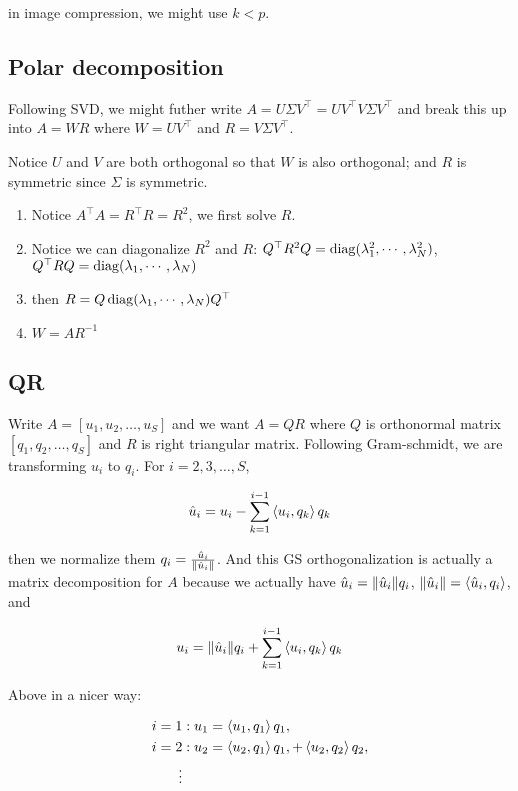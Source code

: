 \documentclass{article}
\begin{document}
\begin{remark}
    in image compression, we might use \(k<p\).
\end{remark}

\subsection{Polar decomposition}

Following SVD, we might futher write \(A = U\Sigma V^\top = UV^\top V\Sigma V^\top\) and break this up into \(A = WR\) where \(W = UV^\top\) and \(R = V\Sigma V^\top\).

Notice \(U\) and \(V\) are both orthogonal so that \(W\) is also orthogonal; and \(R\) is symmetric since \(\Sigma\) is symmetric.

\begin{enumerate}
    \item Notice \(A^\top A = R^\top R = R^2\), we first solve \(R\).
    \item Notice we can diagonalize \(R^2\) and \(R\): \(Q^\top R^2 Q = \operatorname*{diag}(\lambda_1^2,\cdots,\lambda_N^2)\), \(Q^\top R Q = \operatorname*{diag}(\lambda_1,\cdots,\lambda_N)\)
    \item then \(R = Q\operatorname*{diag}(\lambda_1,\cdots,\lambda_N) Q^\top\)
    \item \(W = AR^{-1}\)
\end{enumerate}

\subsection{QR}

Write \(A = [u_1,u_2,\dots, u_S]\) and we want \(A = QR\) where \(Q\) is orthonormal matrix \([q_1,q_2,\dots, q_S]\) and \(R\) is right triangular matrix. Following Gram-schmidt, we are transforming \(u_i\) to \(q_i\). For \(i=2,3,\dots, S\),

\[\hat u_i = u_i - \sum_{k=1}^{i-1} \left \langle u_i,q_k \right \rangle q_k\]

then we normalize them \(q_i = \frac{\hat u_i}{\| \hat u_i \|}\). And this GS orthogonalization is actually  a matrix decomposition for \(A\) because we actually have \(\hat u_i = \| \hat u_i \| q_i\), \(\| \hat u_i \|=\left \langle \hat u_i,q_i \right \rangle\), and 

\[u_i = \| \hat u_i \| q_i + \sum_{k=1}^{i-1} \left \langle u_i,q_k \right \rangle q_k\]

Above in a nicer way:

\begin{equation*}
    \begin{split}
        i=1& : u_1 =\left \langle u_1,q_1 \right \rangle q_1,\\
        i=2& : u_2 =\left \langle u_2,q_1 \right \rangle q_1,+\left \langle u_2,q_2 \right \rangle q_2,\\
        \vdots &
    \end{split}
\end{equation*}
\end{document}

